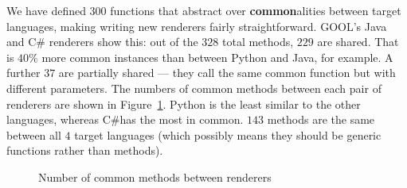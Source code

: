 \documentclass[sigplan,screen,10pt]{acmart}
\newcommand{\Csharp}{C\#}
\newcommand{\abbrev}[1]{\textbf{#1}}
\newcommand{\common}{\abbrev{common}}
\begin{document}
%
%

We have defined $300$ functions that abstract over 
\common alities between target languages, making writing new renderers
fairly straightforward. GOOL's Java and \Csharp{} renderers 
show this: out of the $328$ total methods,
$229$ are shared. That is
$40\%$ more common instances than between Python and Java, for example.
A further $37$ are partially shared --- they 
call the same common function but with different parameters. The numbers of 
common methods between each pair of renderers are shown in 
Figure~\ref{fig:common}. Python is the least 
similar to the other languages, whereas \Csharp has the most in common.
$143$ methods are
the same between all $4$ target languages (which possibly means
they should be generic functions rather than methods).

\begin{figure}[!h]
\caption{Number of common methods between renderers}
\label{fig:common}
\end{figure}
\end{document}
